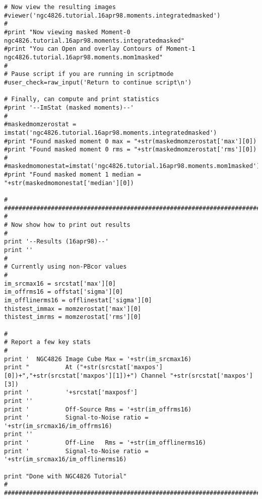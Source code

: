 \begin{verbatim}
# Now view the resulting images
#viewer('ngc4826.tutorial.16apr98.moments.integratedmasked')
#
#print "Now viewing masked Moment-0 ngc4826.tutorial.16apr98.moments.integratedmasked"
#print "You can Open and overlay Contours of Moment-1 ngc4826.tutorial.16apr98.moments.mom1masked"
#
# Pause script if you are running in scriptmode
#user_check=raw_input('Return to continue script\n')

# Finally, can compute and print statistics
#print '--ImStat (masked moments)--'
#
#maskedmomzerostat = imstat('ngc4826.tutorial.16apr98.moments.integratedmasked')
#print "Found masked moment 0 max = "+str(maskedmomzerostat['max'][0])
#print "Found masked moment 0 rms = "+str(maskedmomzerostat['rms'][0])
#
#maskedmomonestat=imstat('ngc4826.tutorial.16apr98.moments.mom1masked')
#print "Found masked moment 1 median = "+str(maskedmomonestat['median'][0])

#
##########################################################################
#
# Now show how to print out results
#
print '--Results (16apr98)--'
print ''
#
# Currently using non-PBcor values
#
im_srcmax16 = srcstat['max'][0]
im_offrms16 = offstat['sigma'][0]
im_offlinerms16 = offlinestat['sigma'][0]
thistest_immax = momzerostat['max'][0]
thistest_imrms = momzerostat['rms'][0]

#
# Report a few key stats
#
print '  NGC4826 Image Cube Max = '+str(im_srcmax16)
print "          At ("+str(srcstat['maxpos'][0])+","+str(srcstat['maxpos'][1])+") Channel "+str(srcstat['maxpos'][3])
print '          '+srcstat['maxposf']
print ''
print '          Off-Source Rms = '+str(im_offrms16)
print '          Signal-to-Noise ratio = '+str(im_srcmax16/im_offrms16)
print ''
print '          Off-Line   Rms = '+str(im_offlinerms16)
print '          Signal-to-Noise ratio = '+str(im_srcmax16/im_offlinerms16)

print "Done with NGC4826 Tutorial"
#
##########################################################################
\end{verbatim}
\normalsize

